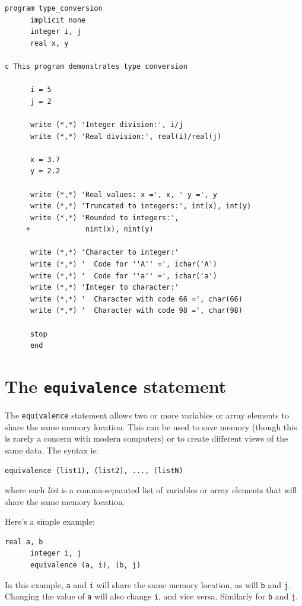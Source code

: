 \begin{lstlisting}[style=fortran77]
      program type_conversion
      implicit none
      integer i, j
      real x, y
      
c This program demonstrates type conversion
      
      i = 5
      j = 2
      
      write (*,*) 'Integer division:', i/j
      write (*,*) 'Real division:', real(i)/real(j)
      
      x = 3.7
      y = 2.2
      
      write (*,*) 'Real values: x =', x, ' y =', y
      write (*,*) 'Truncated to integers:', int(x), int(y)
      write (*,*) 'Rounded to integers:', 
     +             nint(x), nint(y)
      
      write (*,*) 'Character to integer:'
      write (*,*) '  Code for ''A'' =', ichar('A')
      write (*,*) '  Code for ''a'' =', ichar('a')
      write (*,*) 'Integer to character:'
      write (*,*) '  Character with code 66 =', char(66)
      write (*,*) '  Character with code 98 =', char(98)
      
      stop
      end
\end{lstlisting}

\section{The \texttt{equivalence} statement}

The \texttt{equivalence} statement allows two or more variables or array elements to share the same memory location. This can be used to save memory (though this is rarely a concern with modern computers) or to create different views of the same data. The syntax is:

\begin{lstlisting}[style=fortran77]
      equivalence (list1), (list2), ..., (listN)
\end{lstlisting}

where each \emph{list} is a comma-separated list of variables or array elements that will share the same memory location.

Here's a simple example:

\begin{lstlisting}[style=fortran77]
      real a, b
      integer i, j
      equivalence (a, i), (b, j)
\end{lstlisting}

In this example, \texttt{a} and \texttt{i} will share the same memory location, as will \texttt{b} and \texttt{j}. Changing the value of \texttt{a} will also change \texttt{i}, and vice versa. Similarly for \texttt{b} and \texttt{j}.

